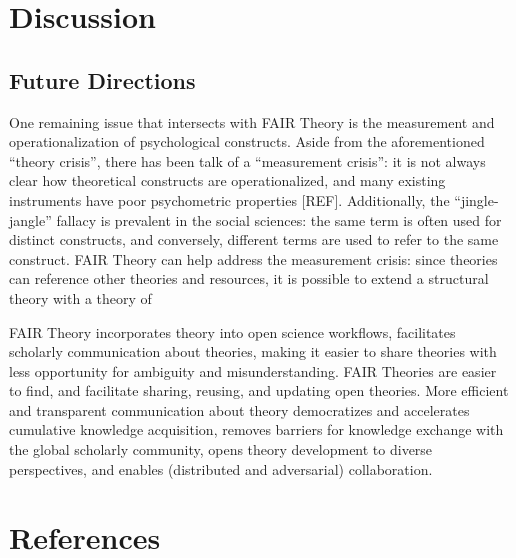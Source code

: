 \documentclass[
  man]{apa6}
\begin{document}
\section{Discussion}\label{discussion}

\subsection{Future Directions}\label{future-directions}

One remaining issue that intersects with FAIR Theory is the measurement and operationalization of psychological constructs.
Aside from the aforementioned ``theory crisis'', there has been talk of a ``measurement crisis'':
it is not always clear how theoretical constructs are operationalized, and many existing instruments have poor psychometric properties {[}REF{]}.
Additionally, the ``jingle-jangle'' fallacy is prevalent in the social sciences:
the same term is often used for distinct constructs, and conversely, different terms are used to refer to the same construct.
FAIR Theory can help address the measurement crisis:
since theories can reference other theories and resources, it is possible to extend a structural theory with a theory of

FAIR Theory incorporates theory into open science workflows,
facilitates scholarly communication about theories,
making it easier to share theories with less opportunity for ambiguity and misunderstanding.
FAIR Theories are easier to find, and facilitate sharing, reusing, and updating open theories.
More efficient and transparent communication about theory democratizes and accelerates cumulative knowledge acquisition,
removes barriers for knowledge exchange with the global scholarly community,
opens theory development to diverse perspectives, and enables (distributed and adversarial) collaboration.

\newpage

\section{References}\label{references}
\end{document}
